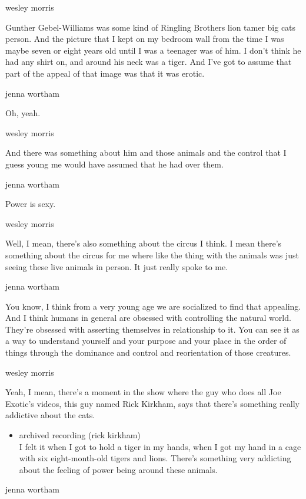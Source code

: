 wesley morris

Gunther Gebel-Williams was some kind of Ringling Brothers lion tamer big
cats person. And the picture that I kept on my bedroom wall from the
time I was maybe seven or eight years old until I was a teenager was of
him. I don't think he had any shirt on, and around his neck was a tiger.
And I've got to assume that part of the appeal of that image was that it
was erotic.

jenna wortham

Oh, yeah.

wesley morris

And there was something about him and those animals and the control that
I guess young me would have assumed that he had over them.

jenna wortham

Power is sexy.

wesley morris

Well, I mean, there's also something about the circus I think. I mean
there's something about the circus for me where like the thing with the
animals was just seeing these live animals in person. It just really
spoke to me.

jenna wortham

You know, I think from a very young age we are socialized to find that
appealing. And I think humans in general are obsessed with controlling
the natural world. They're obsessed with asserting themselves in
relationship to it. You can see it as a way to understand yourself and
your purpose and your place in the order of things through the dominance
and control and reorientation of those creatures.

wesley morris

Yeah, I mean, there's a moment in the show where the guy who does all
Joe Exotic's videos, this guy named Rick Kirkham, says that there's
something really addictive about the cats.

\begin{itemize}
\tightlist
\item
  archived recording (rick kirkham)\\
  I felt it when I got to hold a tiger in my hands, when I got my hand
  in a cage with six eight-month-old tigers and lions. There's something
  very addicting about the feeling of power being around these animals.
\end{itemize}

jenna wortham

